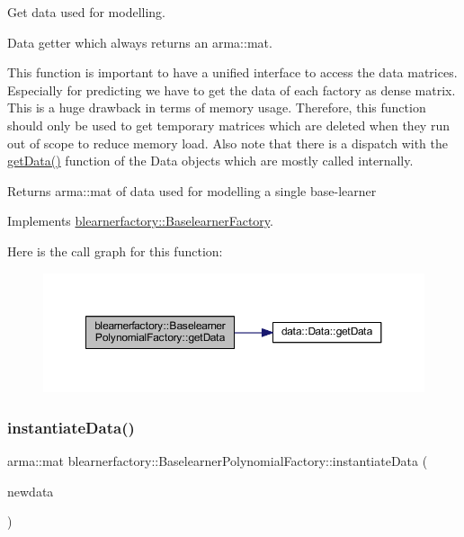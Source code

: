 Get data used for modelling. 

Data getter which always returns an arma\+::mat.

This function is important to have a unified interface to access the data matrices. Especially for predicting we have to get the data of each factory as dense matrix. This is a huge drawback in terms of memory usage. Therefore, this function should only be used to get temporary matrices which are deleted when they run out of scope to reduce memory load. Also note that there is a dispatch with the \mbox{\hyperlink{classblearnerfactory_1_1_baselearner_polynomial_factory_af6d997c89f2e81a490352f23dee1ef9d}{get\+Data()}} function of the Data objects which are mostly called internally.

\begin{DoxyReturn}{Returns}
{\ttfamily arma\+::mat} of data used for modelling a single base-\/learner 
\end{DoxyReturn}


Implements \mbox{\hyperlink{classblearnerfactory_1_1_baselearner_factory_aa3e4580bca870ca3b742dda6c820e1e6}{blearnerfactory\+::\+Baselearner\+Factory}}.

Here is the call graph for this function\+:\nopagebreak
\begin{figure}[H]
\begin{center}
\leavevmode
\includegraphics[width=350pt]{classblearnerfactory_1_1_baselearner_polynomial_factory_af6d997c89f2e81a490352f23dee1ef9d_cgraph}
\end{center}
\end{figure}
\mbox{\label{classblearnerfactory_1_1_baselearner_polynomial_factory_ae8a2c70c75eb37e6c782d1bb17627272}} 
\subsubsection{\texorpdfstring{instantiate\+Data()}{instantiateData()}}
{\footnotesize\ttfamily arma\+::mat blearnerfactory\+::\+Baselearner\+Polynomial\+Factory\+::instantiate\+Data (\begin{DoxyParamCaption}\item[{const arma\+::mat \&}]{newdata }\end{DoxyParamCaption})\hspace{0.3cm}{\ttfamily [virtual]}}



